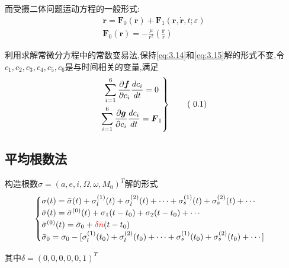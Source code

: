 \documentclass[UTF8]{ctexart}
\begin{document}
而受摄二体问题运动方程的一般形式:
\begin{gather}
	\ddot{\boldsymbol{r}}=\boldsymbol{F}_0(\boldsymbol{r})+\boldsymbol{F}_1(\boldsymbol{r},\dot{\boldsymbol{r}},t;\varepsilon)\\
	\boldsymbol{F}_0(\boldsymbol{r})=-\frac{\mu}{r^2}(\frac{\boldsymbol{r}}{r})
\end{gather}

利用求解常微分方程中的常数变易法,保持\eqref{eq:3.14}和\eqref{eq:3.15}解的形式不变,令$c_1,c_2,c_3,c_4,c_5,c_6$是与时间相关的变量,满足
\[
	\left.
	\begin{gathered}
		\sum_{i=1}^{6}\frac{\partial \boldsymbol{f}}{\partial c_i}\frac{dc_i}{dt}=0\\
		\sum_{i=1}^{6}\frac{\partial \boldsymbol{g}}{\partial c_i}\frac{dc_i}{dt}=\boldsymbol{F}_1
	\end{gathered}\right\}\tag{\stepcounter{equation}\theequation}
\]

\subsection{平均根数法}
构造根数$\sigma=(a,e,i,\Omega,\omega,M_0)^T$解的形式
\begin{equation}
\begin{cases}
	\sigma(t)=\bar{\sigma}(t)+\sigma^{(1)}_l(t)+\sigma^{(2)}_l(t)+\cdots+\sigma^{(1)}_s(t)+\sigma^{(2)}_s(t)+\cdots\\
	\bar{\sigma}(t)=\bar{\sigma}^{(0)}(t)+\sigma_1(t-t_0)+\sigma_2(t-t_0)+\cdots\\
	\bar{\sigma}^{(0)}(t)=\bar{\sigma}_0+\textcolor{red}{\delta\bar{n}}(t-t_0)\\
	\bar{\sigma}_0=\sigma_0-[\sigma^{(1)}_l(t_0)+\sigma^{(2)}_l(t_0)+\cdots+\sigma^{(1)}_s(t_0)+\sigma^{(2)}_s(t_0)+\cdots]
\end{cases}
\end{equation}

其中$\delta=(0,0,0,0,0,1)^T$


\end{document}
